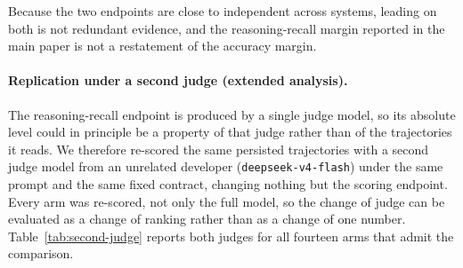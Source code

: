 \documentclass[letterpaper]{article}
\begin{document}
Because the two endpoints are close to independent across systems, leading on both is not redundant evidence, and the reasoning-recall margin reported in the main paper is not a restatement of the accuracy margin.

\paragraph{Replication under a second judge (extended analysis).}
The reasoning-recall endpoint is produced by a single judge model, so its absolute level could in principle be a property of that judge rather than of the trajectories it reads.
We therefore re-scored the same persisted trajectories with a second judge model from an unrelated developer (\texttt{deepseek-v4-flash}) under the same prompt and the same fixed contract, changing nothing but the scoring endpoint.
Every arm was re-scored, not only the full model, so the change of judge can be evaluated as a change of ranking rather than as a change of one number.
Table~\ref{tab:second-judge} reports both judges for all fourteen arms that admit the comparison.
\end{document}
